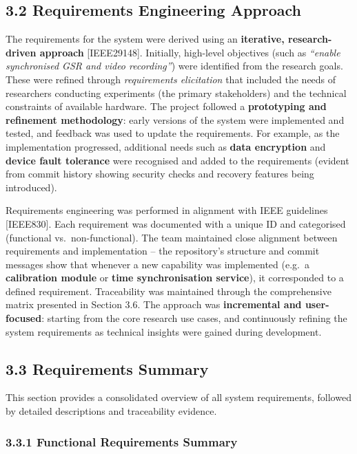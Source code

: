 \documentclass[12pt,a4paper]{article}
\begin{document}
\subsection{3.2 Requirements Engineering Approach}\label{requirements-engineering-approach}

The requirements for the system were derived using an \textbf{iterative, research-driven approach} {[}IEEE29148{]}. Initially, high-level objectives (such as \emph{``enable synchronised GSR and video recording''}) were identified from the research goals. These were refined through \emph{requirements elicitation} that included the needs of researchers conducting experiments (the primary stakeholders) and the technical constraints of available hardware. The project followed a \textbf{prototyping and refinement methodology}: early versions of the system were implemented and tested, and feedback was used to update the requirements. For example, as the implementation progressed, additional needs such as \textbf{data encryption} and \textbf{device fault tolerance} were recognised and added to the requirements (evident from commit history showing security checks and recovery features being introduced).

Requirements engineering was performed in alignment with IEEE guidelines {[}IEEE830{]}. Each requirement was documented with a unique ID and categorised (functional vs.~non-functional). The team maintained close alignment between requirements and implementation -- the repository's structure and commit messages show that whenever a new capability was implemented (e.g.~a \textbf{calibration module} or \textbf{time synchronisation service}), it corresponded to a defined requirement. Traceability was maintained through the comprehensive matrix presented in Section 3.6. The approach was \textbf{incremental and user-focused}: starting from the core research use cases, and continuously refining the system requirements as technical insights were gained during development.

\subsection{3.3 Requirements Summary}\label{requirements-summary}

This section provides a consolidated overview of all system requirements, followed by detailed descriptions and traceability evidence.

\subsubsection{3.3.1 Functional Requirements Summary}\label{functional-requirements-summary}
\end{document}
